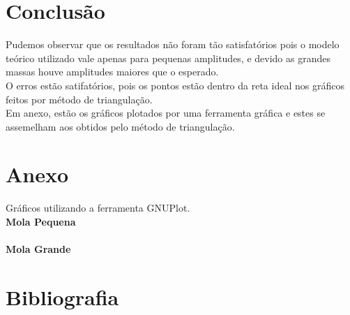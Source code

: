 \documentclass{article}
\begin{document}
\newpage

\section{Conclusão}

Pudemos observar que os resultados não foram tão satisfatórios pois o modelo teórico utilizado vale apenas para pequenas amplitudes, e devido
as grandes massas houve amplitudes maiores que o esperado.\\
O erros estão satifatórios, pois os pontos estão dentro da reta ideal nos gráficos feitos por método de triangulação.\\
Em anexo, estão os gráficos plotados por uma ferramenta gráfica e estes se assemelham aos obtidos pelo método de triangulação.

\section{Anexo}

Gráficos utilizando a ferramenta GNUPlot.\\
\textbf{Mola Pequena} \\
\\
\textbf{Mola Grande} \\

\newpage
\section{Bibliografia}

\end{document}

